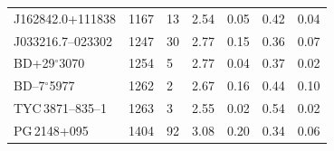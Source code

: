 \begin{table}
\begin{tabular}{lr@{ $\pm$ }lr@{ $\pm$ }lr@{ $\pm$ }l}
   J162842.0+111838        & 1167 & 13 & 2.54 & 0.05 & 0.42 & 0.04 \\
   J033216.7--023302       & 1247 & 30 & 2.77 & 0.15 & 0.36 & 0.07 \\
   BD+29$^{\circ}$3070     & 1254 &  5 & 2.77 & 0.04 & 0.37 & 0.02 \\
   BD--7$^{\circ}$5977     & 1262 &  2 & 2.67 & 0.16 & 0.44 & 0.10 \\
   TYC\,3871--835--1       & 1263 &  3 & 2.55 & 0.02 & 0.54 & 0.02 \\
   PG\,2148+095            & 1404 & 92 & 3.08 & 0.20 & 0.34 & 0.06 \\
   \hline
   \end{tabular}
\end{table}